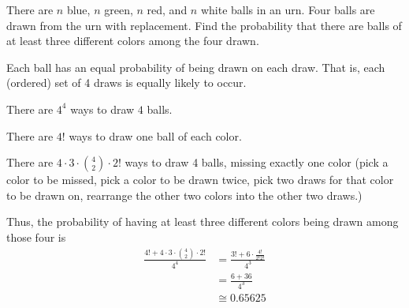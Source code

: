 \begin{problem}[Handout 2, \# 19]
  There are \(n\) blue, \(n\) green, \(n\) red, and \(n\) white balls in an
  urn. Four balls are drawn from the urn with replacement. Find the
  probability that there are balls of at least three different colors among
  the four drawn.
\end{problem}
\begin{solution}
  Each ball has an equal probability of being drawn on each draw. That is,
  each (ordered) set of 4 draws is equally likely to occur.

  There are $4^4$ ways to draw $4$ balls.

  There are $4!$ ways to draw one ball of each color.

  There are $4 \cdot 3 \cdot \binom{4}{2} \cdot 2!$ ways to draw 4 balls,
  missing exactly one color (pick a color to be missed, pick a color to be
  drawn twice, pick two draws for that color to be drawn on, rearrange the
  other two colors into the other two draws.)

  Thus, the probability of having at least three different colors being
  drawn among those four is
\begin{align*}
  \frac{4! + 4 \cdot 3 \cdot \binom{4}{2} \cdot 2!}{4^4} &= \frac{3!+6 \cdot \frac{4!}{2!2!}}{4^3} \\
                                                         &= \frac{6+36}{4^3}\\
                                                         &\cong 0.65625\\
\end{align*}
\end{solution}

